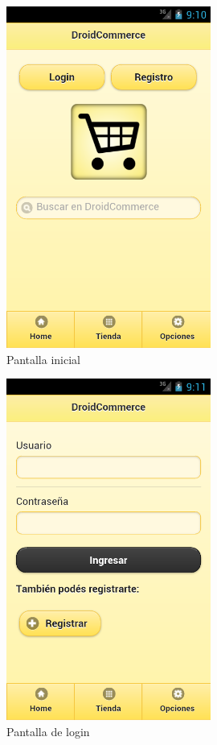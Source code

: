 \begin{figure}[H]
  \centering
    \includegraphics[width=0.6\textwidth]{imagenes/capturas/home.png}
        \caption{Pantalla inicial}
    \label{fig:home}
\end{figure}

\begin{figure}
  \centering
    \includegraphics[width=0.6\textwidth]{imagenes/capturas/login.png}
        \caption{Pantalla de login}
    \label{fig:login}
\end{figure}

